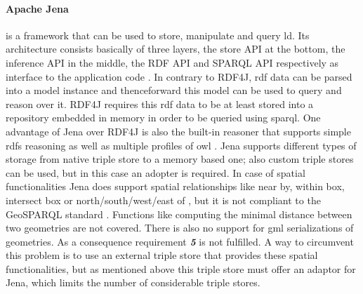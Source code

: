 \documentclass[draft,final]{vutinfth} %
\begin{document}
\paragraph{Apache Jena} is a framework that can be used to store, manipulate and query \gls{ld}. Its architecture consists basically of three layers, the store API at the bottom, the inference API in the middle, the RDF API and  SPARQL API respectively as interface to the application code \cite{the_apache_software_foundation_jena_????}. In contrary to RDF4J, \gls{rdf} data can be parsed into a model instance and thenceforward this model can be used to query and reason over it. RDF4J requires this \gls{rdf} data to be at least stored into a repository embedded in memory in order to be queried using \gls{sparql}. One advantage of Jena over RDF4J is also the built-in reasoner that supports simple \gls{rdfs} reasoning as well as multiple profiles of \gls{owl} \cite{the_apache_software_foundation_jena_????-1}. Jena supports different types of storage from native triple store to a memory based one; also custom triple stores can be used, but in this case an adopter is required. In case of spatial functionalities Jena does support spatial relationships like near by, within box, intersect box or north/south/west/east of \cite{the_apache_software_foundation_spatial_????}, but it is not compliant to the GeoSPARQL standard . Functions like computing the minimal distance between two geometries are not covered. There is also no support for \gls{gml} serializations of geometries. As a consequence requirement \textbf{\textit{5}} is not fulfilled. A way to circumvent this problem is to use an external triple store that provides these spatial functionalities, but as mentioned above this triple store must offer an adaptor for Jena, which limits the number of considerable triple stores.
 
\end{document}
